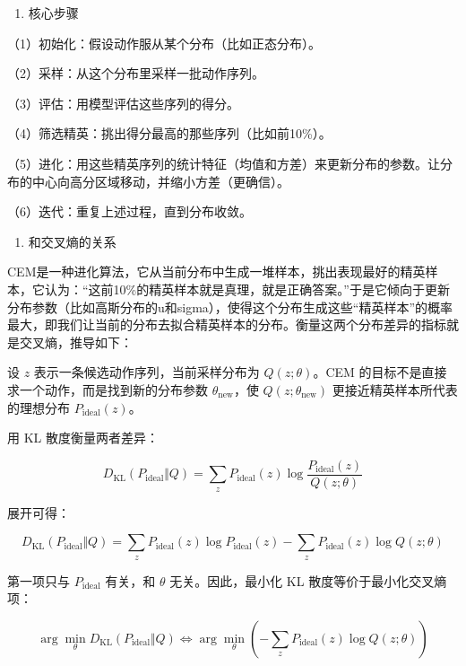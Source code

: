 \begin{enumerate}
\def\labelenumi{\arabic{enumi}.}
\tightlist
\item
  核心步骤
\end{enumerate}

（1）初始化：假设动作服从某个分布（比如正态分布）。

（2）采样：从这个分布里采样一批动作序列。

（3）评估：用模型评估这些序列的得分。

（4）筛选精英：挑出得分最高的那些序列（比如前10\%）。

（5）进化：用这些精英序列的统计特征（均值和方差）来更新分布的参数。让分布的中心向高分区域移动，并缩小方差（更确信）。

（6）迭代：重复上述过程，直到分布收敛。

\begin{enumerate}
\def\labelenumi{\arabic{enumi}.}
\setcounter{enumi}{1}
\tightlist
\item
  和交叉熵的关系
\end{enumerate}

CEM是一种进化算法，它从当前分布中生成一堆样本，挑出表现最好的精英样本，它认为：``这前10\%的精英样本就是真理，就是正确答案。''于是它倾向于更新分布参数（比如高斯分布的u和sigma），使得这个分布生成这些``精英样本''的概率最大，即我们让当前的分布去拟合精英样本的分布。衡量这两个分布差异的指标就是交叉熵，推导如下：

设 \(z\) 表示一条候选动作序列，当前采样分布为 \(Q(z;\theta)\)。CEM 的目标不是直接求一个动作，而是找到新的分布参数 \(\theta_{\mathrm{new}}\)，使 \(Q(z;\theta_{\mathrm{new}})\) 更接近精英样本所代表的理想分布 \(P_{\mathrm{ideal}}(z)\)。

用 KL 散度衡量两者差异：

\[
D_{\mathrm{KL}}(P_{\mathrm{ideal}}\Vert Q)
=\sum_z P_{\mathrm{ideal}}(z)\log\frac{P_{\mathrm{ideal}}(z)}{Q(z;\theta)}
\]

展开可得：

\[
D_{\mathrm{KL}}(P_{\mathrm{ideal}}\Vert Q)
=\sum_z P_{\mathrm{ideal}}(z)\log P_{\mathrm{ideal}}(z)
-\sum_z P_{\mathrm{ideal}}(z)\log Q(z;\theta)
\]

第一项只与 \(P_{\mathrm{ideal}}\) 有关，和 \(\theta\) 无关。因此，最小化 KL 散度等价于最小化交叉熵项：

\[
\arg\min_\theta D_{\mathrm{KL}}(P_{\mathrm{ideal}}\Vert Q)
\Longleftrightarrow
\arg\min_\theta\left(-\sum_z P_{\mathrm{ideal}}(z)\log Q(z;\theta)\right)
\]

